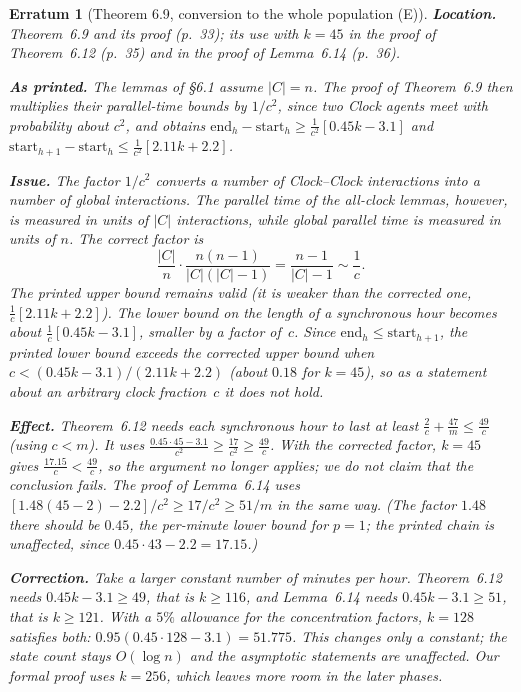 \documentclass[11pt]{article}
\theoremstyle{erratumstyle}
\newtheorem{erratum}{Erratum}
\begin{document}
\begin{erratum}[Theorem 6.9, conversion to the whole population (E)]
\textbf{Location.} Theorem~6.9 and its proof (p.~33); its use with $k=45$ in
the proof of Theorem~6.12 (p.~35) and in the proof of Lemma~6.14 (p.~36).

\medskip
\textbf{As printed.} The lemmas of \S6.1 assume $|C|=n$. The proof of
Theorem~6.9 then multiplies their parallel-time bounds by $1/c^2$, since two
Clock agents meet with probability about $c^2$, and obtains
$\mathrm{end}_h-\mathrm{start}_h\ge\frac{1}{c^2}[0.45k-3.1]$ and
$\mathrm{start}_{h+1}-\mathrm{start}_h\le\frac{1}{c^2}[2.11k+2.2]$.

\medskip
\textbf{Issue.} The factor $1/c^2$ converts a number of Clock--Clock
interactions into a number of global interactions. The parallel time of the
all-clock lemmas, however, is measured in units of $|C|$ interactions, while
global parallel time is measured in units of $n$. The correct factor is
\[
  \frac{|C|}{n}\cdot\frac{n(n-1)}{|C|(|C|-1)}=\frac{n-1}{|C|-1}\sim\frac1c .
\]
The printed upper bound remains valid (it is weaker than the corrected one,
$\frac1c[2.11k+2.2]$). The lower bound on the length of a synchronous hour
becomes about $\frac1c[0.45k-3.1]$, smaller by a factor of~$c$. Since
$\mathrm{end}_h\le\mathrm{start}_{h+1}$, the printed lower bound exceeds the
corrected upper bound when $c<(0.45k-3.1)/(2.11k+2.2)$ (about $0.18$ for
$k=45$), so as a statement about an arbitrary clock fraction~$c$ it does not
hold.

\medskip
\textbf{Effect.} Theorem~6.12 needs each synchronous hour to last at least
$\frac2c+\frac{47}{m}\le\frac{49}{c}$ (using $c<m$). It uses
$\frac{0.45\cdot45-3.1}{c^2}\ge\frac{17}{c^2}\ge\frac{49}{c}$. With the
corrected factor, $k=45$ gives $\frac{17.15}{c}<\frac{49}{c}$, so the
argument no longer applies; we do not claim that the conclusion fails. The
proof of Lemma~6.14 uses $[1.48(45-2)-2.2]/c^2\ge 17/c^2\ge 51/m$ in the same
way. (The factor $1.48$ there should be $0.45$, the per-minute lower bound
for $p=1$; the printed chain is unaffected, since $0.45\cdot43-2.2=17.15$.)

\medskip
\textbf{Correction.} Take a larger constant number of minutes per hour.
Theorem~6.12 needs $0.45k-3.1\ge49$, that is $k\ge116$, and Lemma~6.14 needs
$0.45k-3.1\ge51$, that is $k\ge121$. With a $5\%$ allowance for the
concentration factors, $k=128$ satisfies both:
$0.95(0.45\cdot128-3.1)=51.775$. This changes only a constant; the state
count stays $O(\log n)$ and the asymptotic statements are unaffected. Our
formal proof uses $k=256$, which leaves more room in the later phases.
\end{erratum}
\end{document}
